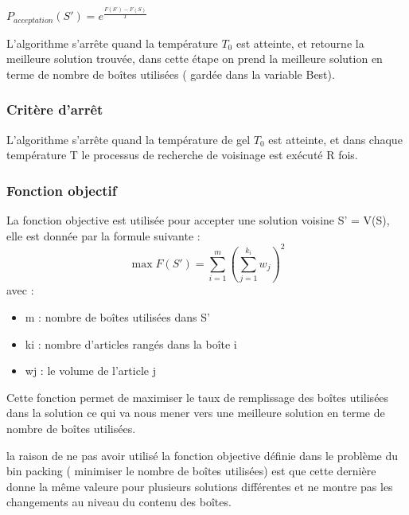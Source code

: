 \documentclass[12pt]{article}
\begin{document}
$ P_{acceptation}(S') = e^{\frac{F(S')-F(S)}{T}}$ \newline



L’algorithme s'arrête quand la température \emph{$T_{0}$} est atteinte, et retourne la meilleure solution trouvée,
 dans cette étape on prend la meilleure solution en terme de nombre de boîtes utilisées ( gardée dans la variable Best). 

\subsubsection{Critère d'arrêt}
L’algorithme s’arrête quand la température de gel \emph{$T_{0}$} est atteinte, et dans chaque température T le processus de recherche de voisinage est exécuté R fois.

\subsubsection{Fonction objectif}
La fonction objective est utilisée pour accepter une solution voisine S’ = V(S), elle est donnée par la formule suivante : 
\begin{equation}
    \max{F(S')} = \sum_{i=1}^m (\sum_{j=1}^{k_{i}} w_{j})^{2}
\end{equation}
avec : 
\begin{itemize}
\item m : nombre de boîtes utilisées dans S’ 
\item ki : nombre d’articles rangés dans la boîte i 
\item wj : le volume de l’article j 
\end{itemize}
Cette fonction permet de maximiser le taux de remplissage des boîtes utilisées dans la solution ce qui va nous mener vers une meilleure solution en terme de nombre de boîtes utilisées. 

la raison de ne pas avoir utilisé la fonction objective définie dans le problème du bin packing ( minimiser le nombre de boîtes utilisées) est que cette dernière donne la même valeure pour plusieurs solutions différentes et ne montre pas les changements au niveau du contenu des boîtes. 
\end{document}
